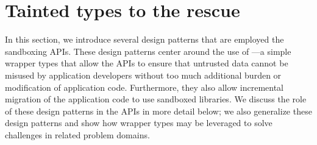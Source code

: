 \section{Tainted types to the rescue}
\label{sec:tainted}
%
In this section, we introduce several design patterns that are employed the 
\sys sandboxing APIs.
%
These design patterns center around the use of \tainted---a simple wrapper 
types that allow the \sys APIs to ensure that untrusted data cannot 
be misused by application developers without too much additional burden or 
modification of application code.
%
Furthermore, they also allow incremental migration of the application code to 
use sandboxed libraries. 
%
We discuss the role of these design patterns in the \sys APIs in more detail 
below; we also generalize these design patterns and show how wrapper types may 
be leveraged to solve challenges in related problem domains.





